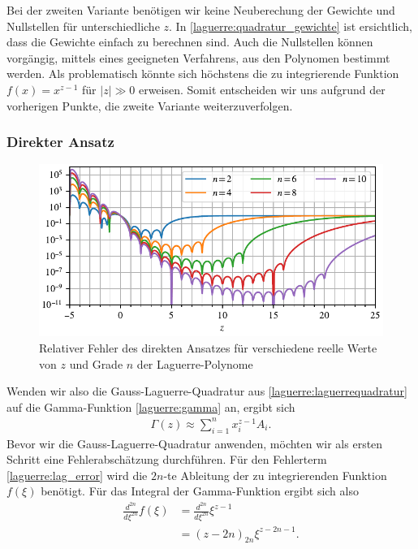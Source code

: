 Bei der zweiten Variante benötigen wir keine Neuberechung der Gewichte
und Nullstellen für unterschiedliche $z$.
In \eqref{laguerre:quadratur_gewichte} ist ersichtlich,
dass die Gewichte einfach zu berechnen sind.
Auch die Nullstellen können vorgängig,
mittels eines geeigneten Verfahrens,
aus den Polynomen bestimmt werden.
Als problematisch könnte sich höchstens
die zu integrierende Funktion $f(x)=x^{z-1}$ für $|z| \gg 0$ erweisen.
Somit entscheiden wir uns aufgrund der vorherigen Punkte,
die zweite Variante weiterzuverfolgen.

\subsubsection{Direkter Ansatz}
%
\begin{figure}
\centering
% 
\includegraphics{papers/laguerre/images/rel_error_simple.pdf}
\caption{Relativer Fehler des direkten Ansatzes
für verschiedene reelle Werte von $z$ und Grade $n$ der
Laguerre-Polynome}%
\label{laguerre:fig:rel_error_simple}
\end{figure}
Wenden wir also die Gauss-Laguerre-Quadratur aus
\eqref{laguerre:laguerrequadratur} auf die Gamma-Funktion
\eqref{laguerre:gamma} an,
ergibt sich
\begin{align}
\Gamma(z)
\approx
\sum_{i=1}^n x_i^{z-1} A_i
\label{laguerre:naive_lag}
.
\end{align}
Bevor wir die Gauss-Laguerre-Quadratur anwenden,
möchten wir als ersten Schritt eine Fehlerabschätzung durchführen.
Für den Fehlerterm \eqref{laguerre:lag_error} wird die $2n$-te Ableitung
der zu integrierenden Funktion $f(\xi)$ benötigt.
Für das Integral der Gamma-Funktion ergibt sich also
\begin{align*}
\frac{d^{2n}}{d\xi^{2n}} f(\xi)
 & =
\frac{d^{2n}}{d\xi^{2n}} \xi^{z-1}
\\
 & =
(z - 2n)_{2n} \xi^{z - 2n - 1}
.
\end{align*}
